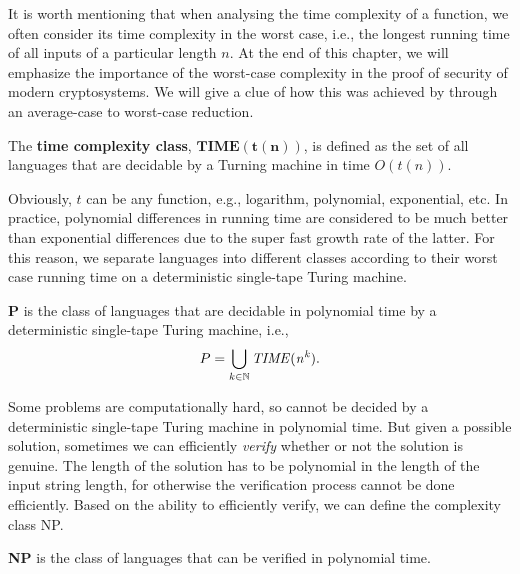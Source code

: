 \documentclass[../main.tex]{subfiles}
\begin{document}
It is worth mentioning that when analysing the time complexity of a function, we often consider its time complexity in the worst case, i.e., the longest running time of all inputs of a particular length $n$. At the end of this chapter, we will emphasize the importance of the worst-case complexity in the proof of security of modern cryptosystems. We will give a clue of how this was achieved by \citet{ajtai1996generating} through an average-case to worst-case reduction.

\begin{definition}
The \textbf{time complexity class},
\reversemarginpar
{}
$\mathbf{TIME(t(n))}$, is defined as the set of all languages that are decidable by a Turning machine in time $O(t(n))$.
\end{definition}

Obviously, $t$ can be any function, e.g., logarithm, polynomial, exponential, etc. In practice, polynomial differences in running time are considered to be much better than exponential differences due to the super fast growth rate of the latter. For this reason, we separate languages into different classes according to their worst case running time on a deterministic single-tape Turing machine. 

\begin{definition}
\textbf{P} 
\reversemarginpar
{}
is the class of languages that are decidable in polynomial time by a deterministic single-tape Turing machine, i.e., %
\begin{equation*}
    P = \bigcup_{k \in \mathbb{N}} \it{TIME}(n^k).
\end{equation*}
\end{definition}

Some problems are computationally hard, so cannot be decided by a deterministic single-tape Turing machine in polynomial time. But given a possible solution, sometimes we can efficiently \textit{verify} whether or not the solution is genuine. The length of the solution has to be polynomial in the length of the input string length, for otherwise the verification process cannot be done efficiently. Based on the ability to efficiently verify, we can define the complexity class NP. 

\begin{definition}
\textbf{NP} 
\reversemarginpar
{}
is the class of languages that can be verified in polynomial time.
\end{definition}
\end{document}
